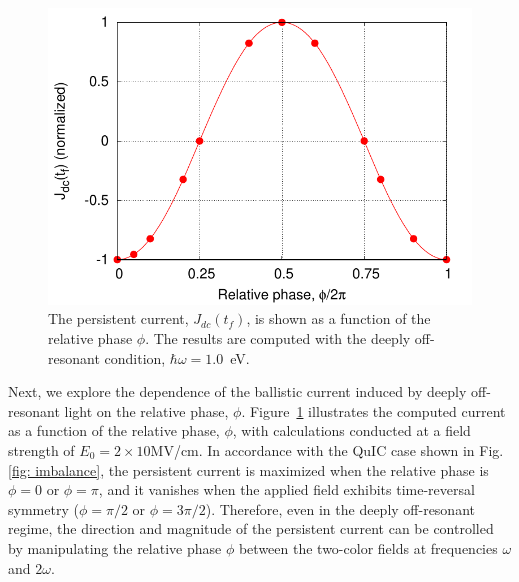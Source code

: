 \begin{figure}[htbp]
\centering
\includegraphics[width=0.8\linewidth]{pic/jdc_vs_phi_off_resonance.pdf}
\caption{\label{fig:jdc_vs_phi_off_resonance} 
The persistent current, $J_{dc}(t_f)$, is shown as a function of the relative phase $\phi$. The results are computed with the deeply off-resonant condition, $\hbar\omega = 1.0$~eV.
}
\end{figure}

Next, we explore the dependence of the ballistic current induced by deeply off-resonant light on
the relative phase, $\phi$. Figure~\ref{fig:jdc_vs_phi_off_resonance} illustrates the computed
current as a function of the relative phase, $\phi$, with calculations conducted at a field
strength of $E_0=2 \times 10$MV/cm. In accordance with the QuIC case shown in Fig.\ref{fig:
imbalance}, the persistent current is maximized when the relative phase is $\phi=0$ or $\phi=\pi$,
and it vanishes when the applied field exhibits time-reversal symmetry ($\phi=\pi/2$ or
$\phi=3\pi/2$). Therefore, even in the deeply off-resonant regime, the direction and magnitude of
the persistent current can be controlled by manipulating the relative phase $\phi$ between the
two-color fields at frequencies $\omega$ and $2\omega$.\\

